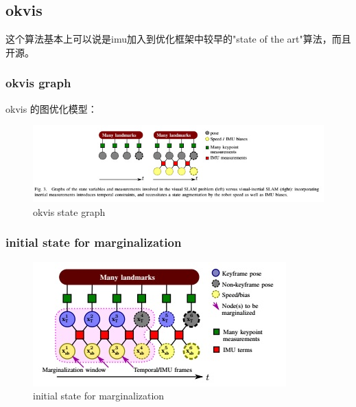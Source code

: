 \documentclass[10pt,a4paper]{article}
\begin{document}
\subsection{okvis}
这个算法基本上可以说是imu加入到优化框架中较早的"state of the art"算法，而且开源。
\subsubsection{okvis graph}
okvis 的图优化模型：
\begin{figure}[h]
	\centering
	\includegraphics[width=1.0\linewidth]{images/okvis-vislam-state-graph}
	\caption{okvis state graph}
	\label{fig:okvis-vislam-state-graph}
\end{figure}

\subsubsection{initial state for marginalization}

\begin{figure}[h!]
	\centering
	\includegraphics[width=0.7\linewidth]{images/okvis-marginalization-initial}
	\caption{initial state for marginalization}
	\label{fig:okvis-marginalization-initial}
\end{figure}
\end{document}
